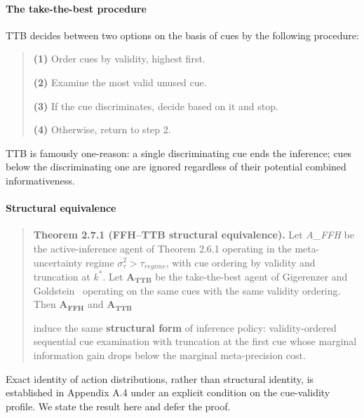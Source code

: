 \documentclass{article}
\begin{document}
\paragraph{The take-the-best
procedure}\label{the-take-the-best-procedure}

TTB decides between two options on the basis of cues by the following
procedure:

\begin{quote}
\textbf{(1)} Order cues by validity, highest first.

\textbf{(2)} Examine the most valid unused cue.

\textbf{(3)} If the cue discriminates, decide based on it and stop.

\textbf{(4)} Otherwise, return to step 2.
\end{quote}

TTB is famously one-reason: a single discriminating cue ends the
inference; cues below the discriminating one are ignored regardless of
their potential combined informativeness.

\paragraph{Structural equivalence}\label{structural-equivalence}

\begin{quote}
\textbf{Theorem 2.7.1 (FFH--TTB structural equivalence).} Let
\emph{A\_FFH} be the active-inference agent of Theorem 2.6.1 operating
in the meta-uncertainty regime \(\sigma_{\tau}^{2} > \tau_{regime}\),
with cue ordering by validity and truncation at \(k^{*}\). Let
\(\mathbf{A}_{\mathbf{TTB}}\) be the take-the-best agent of Gigerenzer and Goldstein~\cite{gigerenzer1996} operating on the same cues with the same validity
ordering. Then \(\mathbf{A}_{\mathbf{FFH}}\) and
\(\mathbf{A}_{\mathbf{TTB}}\)

induce the same \textbf{structural form} of inference policy:
validity-ordered sequential cue examination with truncation at the first
cue whose marginal information gain drops below the marginal
meta-precision cost.
\end{quote}

Exact identity of action distributions, rather than structural identity,
is established in Appendix A.4 under an explicit condition on the
cue-validity profile. We state the result here and defer the proof.
\end{document}
